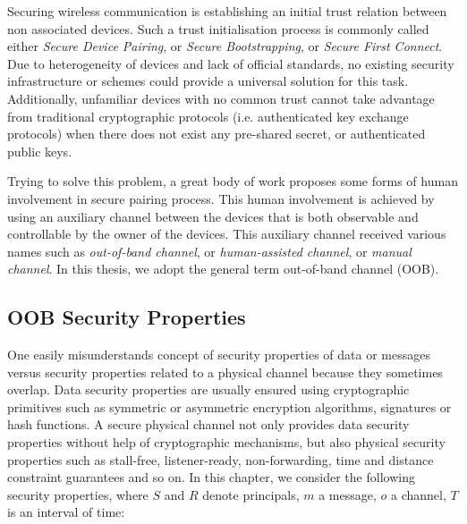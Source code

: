 Securing wireless communication is establishing an initial trust relation between non associated devices. Such a trust initialisation process is commonly called either \textit{Secure Device Pairing}, or \textit{Secure Bootstrapping}, or \textit{Secure First Connect}. Due to heterogeneity of devices and lack of official standards, no existing security infrastructure or schemes could provide a universal solution for this task. Additionally, unfamiliar devices with no common trust cannot take advantage from traditional cryptographic protocols (i.e. authenticated key exchange protocols) when there does not exist any pre-shared secret, or authenticated public keys.

Trying to solve this problem, a great body of work proposes some forms of human involvement in secure pairing process. This human involvement is achieved by using an auxiliary channel between the devices that is both observable and controllable by the owner of the devices. This auxiliary channel received various names such as \textit{out-of-band channel}, or \textit{human-assisted channel}, or \textit{manual channel}. In this thesis, we adopt the general term out-of-band channel (OOB). 

\subsection{OOB Security Properties}

One easily misunderstands concept of security properties of data or messages versus security properties related to a physical channel because they sometimes overlap. Data security properties are usually ensured using cryptographic primitives such as symmetric or asymmetric encryption algorithms, signatures or hash functions. A secure physical channel not only provides data security properties without help of cryptographic mechanisms, but also physical security properties such as stall-free, listener-ready, non-forwarding, time and distance constraint guarantees and so on. In this chapter, we consider the following security properties, where $S$ and $R$ denote principals, $m$ a message, $o$ a channel, $T$ is an interval of time:

